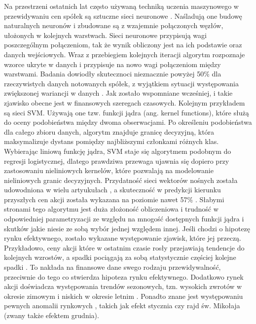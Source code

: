 \documentclass[12pt,a4paper,twoside,openany]{book}
\begin{document}
Na przestrzeni ostatnich lat często używaną techniką uczenia maszynowego w przewidywaniu cen spółek są sztuczne sieci neuronowe \citep[np.][]{sureshkumar2011,kara2011,mohan2005,moghaddam2016}. Naśladują one budowę naturalnych neuronów i zbudowane są z wzajemnie połączonych węzłów, ułożonych w kolejnych warstwach. Sieci neuronowe przypisują wagi poszczególnym połączeniom, tak że wynik obliczony jest na ich podstawie oraz danych wejściowych. Wraz z przebiegiem kolejnych iteracji algorytm rozpoznaje wzorce ukryte w danych i przypisuje na nowo wagi połączeniom między warstwami. Badania dowiodły skutecznoci nieznacznie powyżej 50\% dla rzeczywistych danych notowanych spółek, z wyjątkiem sytuacji występowania zwiększonej wariancji w danych \citep{patel2014}. Jak zostało wspomniane wcześniej, i takie zjawisko obecne jest w finansowych szeregach czasowych. Kolejnym przykładem są sieci SVM. Używają one tzw. funkcji jądra (ang. kernel functions), które służą do oceny podobieństwa między dwoma obserwacjami. Po określeniu podobieństwa dla całego zbioru danych, algorytm znajduje granicę decyzyjną, która maksymalizuje dystans pomiędzy najbliższymi członkami różnych klas. Wybierając liniową funkcję jądra, SVM staje się algorytmem podobnym do regresji logistycznej, dlatego prawdziwa przewaga ujawnia się dopiero przy zastosowaniu nieliniowych kernelów, które pozwalają na modelowanie nieliniowych granic decyzyjnych. Przydatność sieci wektorów nośnych została udowodniona w wielu artyukułach \citep[np.][]{thenmozhi2016,shen2015}, a skuteczność w predykcji kierunku przyszłych cen akcji została wykazana na poziomie nawet 57\% \citep{kim2003}. Słabymi stronami tego algorytmu jest duża złożoność obliczeniowa i trudność w odpowiedniej parametryzacji ze względu na mnogość dostępnych funkcji jądra i skutków jakie niesie ze sobą wybór jednej względem innej. Jeśli chodzi o hipotezę rynku efektywnego, zostało wykazane występowanie zjawisk, które jej przeczą. Przykładowo, ceny akcji które w ostatnim czasie rosły przejawiają tendencje do kolejnych wzrostów, a spadki pociągają za sobą statystycznie częściej kolejne spadki \citep{jegadeesh1993}. To nakłada na finansowe dane swego rodzaju przewidywalność, przeciwnie do tego co stwierdza hipoteza rynku efektywnego. Dodatkowo rynek akcji doświadcza występowania trendów sezonowych, tzn. wysokich zwrotów w okresie zimowym i niskich w okresie letnim \citep{jacobsen2013,granger1992}. Ponadto znane jest występowaniu pewnych anomalii rynkowych \citep{bouman2002}, takich jak efekt stycznia czy rajd św. Mikołaja (zwany także efektem grudnia). 
\end{document}
